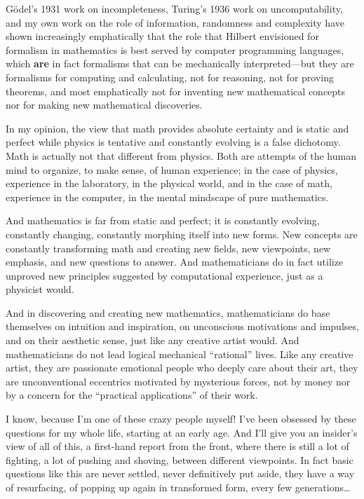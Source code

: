 \documentclass[12pt]{book}
\begin{document}
G\"odel's 1931 work on incompleteness, Turing's 1936 work on uncomputability, and
my own work on the role of information, randomness and complexity have shown
increasingly emphatically that the role that Hilbert envisioned for formalism
in mathematics is best served by computer programming languages, which \textbf{are} in fact formalisms
that can be mechanically interpreted---but they are formalisms for computing and calculating,
not for reasoning, not for proving theorems, and most emphatically not for inventing
new mathematical concepts nor for making new mathematical discoveries. 

In my opinion, the view that math provides absolute certainty and is static and perfect
while physics is tentative and constantly evolving is a false dichotomy.  Math is actually
not that different from physics.  Both are attempts of the human mind to organize, to make
sense, of human experience; in the case of physics, experience in the laboratory, in the
physical world, and in the case of math, experience in the computer, in the mental mindscape
of pure mathematics.

And mathematics is far from static and perfect; it is constantly evolving, constantly changing,
constantly morphing itself into new forms.  New concepts are constantly transforming math and
creating new fields, new viewpoints, new emphasis, and new questions to answer. 
And mathematicians do in fact utilize unproved new principles suggested by
computational experience, just as a physicist would.

And in discovering and creating new mathematics, mathematicians do base themselves on
intuition and inspiration, on unconscious motivations and impulses, and on their aesthetic sense, just
like any creative artist would.  And mathematicians do not lead logical mechanical ``rational''
lives.  Like any creative artist, they are passionate emotional people who deeply care
about their art, they are unconventional eccentrics motivated by mysterious forces, not by money
nor by a concern for the ``practical applications'' of their work.

I know, because I'm one of these crazy people myself!  I've been obsessed by these questions
for my whole life, starting at an early age.  And I'll give you an insider's view of all of this,
a first-hand report from the front, where there is still a lot of fighting, a lot of pushing
and shoving, between different viewpoints.
In fact basic questions like this are never settled, never definitively put aside, they have
a way of resurfacing, of popping up again in transformed form, every few generations\ldots
\end{document}
